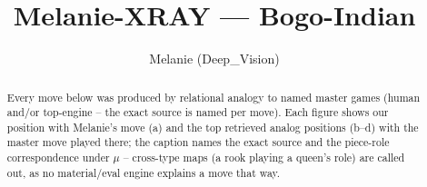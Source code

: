 \documentclass[11pt]{article}
\title{Melanie-XRAY — Bogo-Indian}
\author{Melanie (Deep\_Vision)}
\date{}
\begin{document}
\maketitle

\begin{abstract}Every move below was produced by relational analogy to named master games (human and/or top-engine -- the exact source is named per move). Each figure shows our position with Melanie's move (a) and the top retrieved analog positions (b--d) with the master move played there; the caption names the exact source and the piece-role correspondence under $\mu$ -- cross-type maps (a rook playing a queen's role) are called out, as no material/eval engine explains a move that way.\end{abstract}

\begin{figure}[p]\centering
\begin{subfigure}{0.46\textwidth}\centering
\resizebox{\linewidth}{!}{%
\newchessgame
\chessboard[
  setfen={r1b1k2r/ppppqppp/2n1pn2/8/2PP4/2b2NP1/PP1BPP1P/R2QKB1R w KQkq - 0 7},
  showmover=false,
  pgfstyle=straightmove, color=movearrow, markmove={d2-c3}
]}
\caption{}
\end{subfigure}\hfill
\begin{subfigure}{0.46\textwidth}\centering
\resizebox{\linewidth}{!}{%
\newchessgame
\chessboard[
  setfen={r1b1k2r/ppppqppp/2n1pn2/8/2PP4/2b2NP1/PP1BPP1P/R2QKB1R w KQkq - 0 7},
  showmover=false,
  pgfstyle=straightmove, color=movearrow, markmove={d2-c3}
]}
\caption{}
\end{subfigure}
\\[4pt]
\begin{subfigure}{0.46\textwidth}\centering
\resizebox{\linewidth}{!}{%
\newchessgame
\chessboard[
  setfen={r1b1k2r/ppppqppp/2n1pn2/8/2PP4/2b2NP1/PP1BPP1P/R2QKB1R w KQkq - 0 7},
  showmover=false,
  pgfstyle=straightmove, color=movearrow, markmove={d2-c3}
]}
\caption{}
\end{subfigure}\hfill
\begin{subfigure}{0.46\textwidth}\centering
\resizebox{\linewidth}{!}{%
\newchessgame
\chessboard[
  setfen={r1b1k2r/ppppqppp/2n1pn2/8/2PP4/2b2NP1/PP1BPP1P/R2QKB1R w KQkq - 0 7},
  showmover=false,
  pgfstyle=straightmove, color=movearrow, markmove={d2-c3}
]}
\caption{}
\end{subfigure}

\end{figure}
\end{document}
